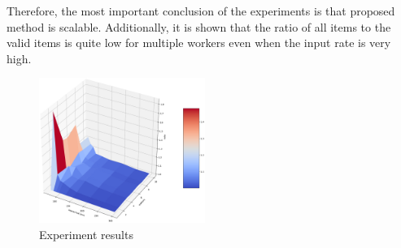 Therefore, the most important conclusion of the experiments is that proposed method is scalable. Additionally, it is shown that the ratio of all items to the valid items is quite low for multiple workers even when the input rate is very high.

\begin{figure}[htbp]
  \centering
  \includegraphics[width=0.48\textwidth]{pics/experiment}
  \caption{Experiment results}
  \label {experiment}
\end{figure}
